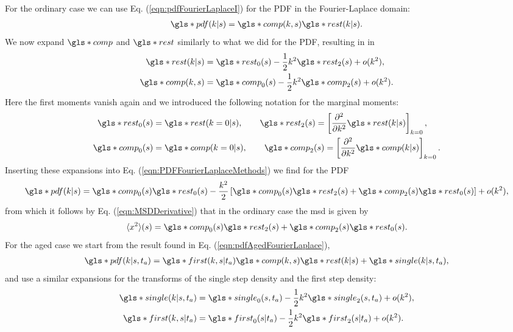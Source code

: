 For the ordinary case we can use Eq. (\ref{eqn:pdfFourierLaplaceI}) for the \gls*{PDF} in the Fourier-Laplace domain:
%
\begin{align}
\gls*{pdf}(k|s) = \gls*{comp}(k,s) \gls*{rest}(k|s) \label{eqn:PDFFourierLaplaceMethods} .
\end{align}
%
We now expand $\gls*{comp}$ and $\gls*{rest}$ similarly to what we did for the \gls*{PDF}, resulting in in 
%
\begin{align}
\gls*{rest}(k|s) &= \gls*{rest}_0(s) - \frac{1}{2} k^2 \gls*{rest}_2(s) + o(k^2) \label{eqn:rExpansion} ,\\
\gls*{comp}(k,s) &= \gls*{comp}_0(s)- \frac{1}{2} k^2 \gls*{comp}_2(s) + o(k^2) .
\end{align}
%
Here the first moments vanish again and we introduced the following notation for the marginal moments:
%
\begin{align}
\gls*{rest}_0(s) &=   \gls*{rest}(k=0|s), \qquad \gls*{rest}_2 (s) =   \left[ \npder{}{k}{2} \gls*{rest}(k|s) \right]_{k=0}, \\
\gls*{comp}_0(s) &=   \gls*{comp}(k=0|s), \qquad \gls*{comp}_2 (s) =   \left[ \npder{}{k}{2} \gls*{comp}(k|s) \right]_{k=0}.
\end{align}
%
Inserting these expansions into Eq. (\ref{eqn:PDFFourierLaplaceMethods}) we find for the \gls*{PDF}
%
\begin{align}
\gls*{pdf}(k|s)  = \gls*{comp}_0(s)\gls*{rest}_0(s) - \frac{k^2}{2}\left[\gls*{comp}_0(s) \gls*{rest}_2(s)+\gls*{comp}_2(s)\gls*{rest}_0(s)\right] +o(k^2) ,
\end{align}
%
from which it follows by Eq. (\ref{eqn:MSDDerivative}) that in the ordinary case the \gls*{msd} is given by 
%
\begin{align}
\mean{x^2}(s) = \gls*{comp}_0(s) \gls*{rest}_2(s)+\gls*{comp}_2(s)\gls*{rest}_0(s) \label{eqn:x2Ordinary}. 
\end{align}
%
For the aged case we start from the result found in Eq. (\ref{eqn:pdfAgedFourierLaplace}),
%
\begin{align}
\gls*{pdf}(k|s,t_a) =  \gls*{first}(k,s|t_a)  \gls*{comp}(k,s) \gls*{rest}(k|s) + \gls*{single}(k|s,t_a) ,
\end{align}
%
and use a similar expansions for the transforms of the single step density and the first step density:
%
\begin{align}
\gls*{single}(k|s,t_a) &= \gls*{single}_0(s,t_a) - \frac{1}{2} k^2 \gls*{single}_2 (s,t_a) + o(k^2) ,\\ 
\gls*{first}(k,s|t_a) &= \gls*{first}_0(s|t_a)- \frac{1}{2} k^2 \gls*{first}_2(s|t_a) + o(k^2) .
\end{align}
